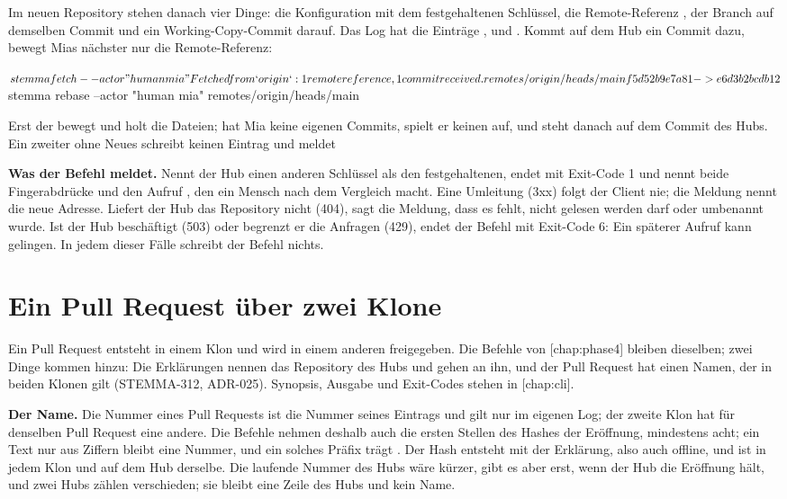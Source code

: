 Im neuen Repository stehen danach vier Dinge: die Konfiguration  mit dem
festgehaltenen Schlüssel, die Remote-Referenz , der Branch
 auf demselben Commit und ein Working-Copy-Commit darauf.
Das Log hat die Einträge ,  und .
Kommt auf dem Hub ein Commit dazu, bewegt Mias nächster  nur die Remote-Referenz:

\starttyping
$ stemma fetch --actor "human mia"
Fetched from `origin`: 1 remote reference, 1 commit received.
  remotes/origin/heads/main  f5d52b9e7a81 -> e6d3b2bcdb12
$ stemma rebase --actor "human mia" remotes/origin/heads/main
\stoptyping

Erst der  bewegt  und holt die Dateien; hat Mia keine eigenen Commits,
spielt er keinen auf, und  steht danach auf dem Commit des Hubs.
Ein zweiter  ohne Neues schreibt keinen Eintrag und meldet

\startinfobox
{\bf Was der Befehl meldet.}
Nennt der Hub einen anderen Schlüssel als den festgehaltenen, endet  mit Exit-Code 1
und nennt beide Fingerabdrücke und den Aufruf , den ein Mensch nach dem
Vergleich macht.
Eine Umleitung (3xx) folgt der Client nie; die Meldung nennt die neue Adresse.
Liefert der Hub das Repository nicht (404), sagt die Meldung, dass es fehlt, nicht gelesen
werden darf oder umbenannt wurde.
Ist der Hub beschäftigt (503) oder begrenzt er die Anfragen (429), endet der Befehl mit
Exit-Code 6: Ein späterer Aufruf kann gelingen.
In jedem dieser Fälle schreibt der Befehl nichts.
\stopinfobox

\section[sec:pr-two-clones]{Ein Pull Request über zwei Klone}

Ein Pull Request entsteht in einem Klon und wird in einem anderen freigegeben.
Die Befehle von [chap:phase4] bleiben dieselben; zwei Dinge kommen hinzu: Die
Erklärungen nennen das Repository des Hubs und gehen an ihn, und der Pull Request hat einen
Namen, der in beiden Klonen gilt (STEMMA-312, ADR-025).
Synopsis, Ausgabe und Exit-Codes stehen in [chap:cli].

{\bf Der Name.}
Die Nummer eines Pull Requests ist die Nummer seines Eintrags  und gilt nur im
eigenen Log; der zweite Klon hat für denselben Pull Request eine andere.
Die Befehle nehmen deshalb auch die ersten Stellen des Hashes der Eröffnung, mindestens acht;
ein Text nur aus Ziffern bleibt eine Nummer, und ein solches Präfix trägt .
Der Hash entsteht mit der Erklärung, also auch offline, und ist in jedem Klon und auf dem Hub
derselbe.
Die laufende Nummer des Hubs wäre kürzer, gibt es aber erst, wenn der Hub die Eröffnung hält,
und zwei Hubs zählen verschieden; sie bleibt eine Zeile des Hubs und kein Name.

